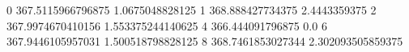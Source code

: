 0 367.5115966796875 1.0675048828125
1 368.888427734375 2.4443359375
2 367.9974670410156 1.553375244140625
4 366.444091796875 0.0
6 367.9446105957031 1.500518798828125
8 368.7461853027344 2.302093505859375
